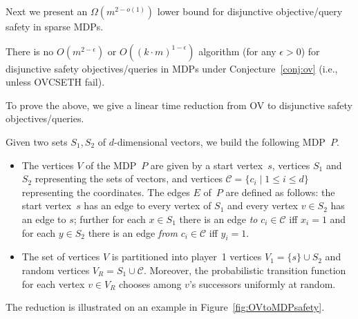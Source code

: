 \documentclass[11pt,letterpaper]{article}
\newcommand{\lu}{\textup{(}}
\newcommand{\ru}{\textup{)}\xspace}
\newcommand{\upbr}[1]{\lu #1\ru}
\newcommand{\mdp}{P\xspace}
\newif\iffullversion
\newcommand{\infull}[1]{\iffullversion #1\fi}
\newcommand{\inshort}[1]{\iffullversion \else #1\fi}
\begin{document}
Next we present an $\Omega(m^{2-o(1)})$ lower bound for disjunctive objective/query safety in sparse MDPs.

\begin{theorem}\label{thm:safety_OVChard}
  There is no $O(m^{2-\epsilon})$ or $O((k\cdot m)^{1-\epsilon})$ algorithm \upbr{for any $\epsilon > 0$} for disjunctive safety objectives/queries in MDPs under Conjecture~\ref{conj:ov} \upbr{i.e., unless
  OVC\infull{ and }\inshort{ \& }SETH fail}.
  \infull{In particular, there is no such algorithm for deciding whether the winning set is non-empty
  or deciding whether a specific vertex is in the winning set.}
\end{theorem}

To prove the above, we give a linear time reduction from OV to disjunctive safety objectives/queries.

\begin{reduction}\label{red:OVtoMDPsafety}
 Given two sets $S_1, S_2$ of $d$-dimensional vectors, we build the following MDP~$\mdp$.  
 \begin{itemize}
  \item   The vertices $V$ of the MDP~$\mdp$
  are given by a start vertex~$s$, vertices $S_1$ and $S_2$ representing the 
  sets of vectors, and 
  vertices $\mathcal{C}=\{c_i \mid 1 \leq i \leq d\}$ representing the 
  coordinates. The edges $E$ of~$\mdp$ are defined as follows: the start vertex~$s$
  has an edge to every vertex of $S_1$ and every vertex $v \in S_2$ has an edge to $s$;
  further for each $x \in S_1$
  there is an edge \emph{to} $c_i \in \mathcal{C}$ iff $x_i=1$ and for each $y \in S_2$
  there is an edge \emph{from} $c_i \in \mathcal{C}$ iff $y_i=1$.
  \item The set of vertices $V$ is partitioned into player~1 vertices $V_1=\{s\}\cup S_2$
	and random vertices $V_R= S_1 \cup \mathcal{C}$.
	Moreover, the probabilistic transition function for each vertex $v \in V_R$ chooses among $v$'s successors
	uniformly at random.	
 \end{itemize}
\end{reduction}
The reduction is illustrated on an example in Figure~\ref{fig:OVtoMDPsafety}. 
\end{document}

